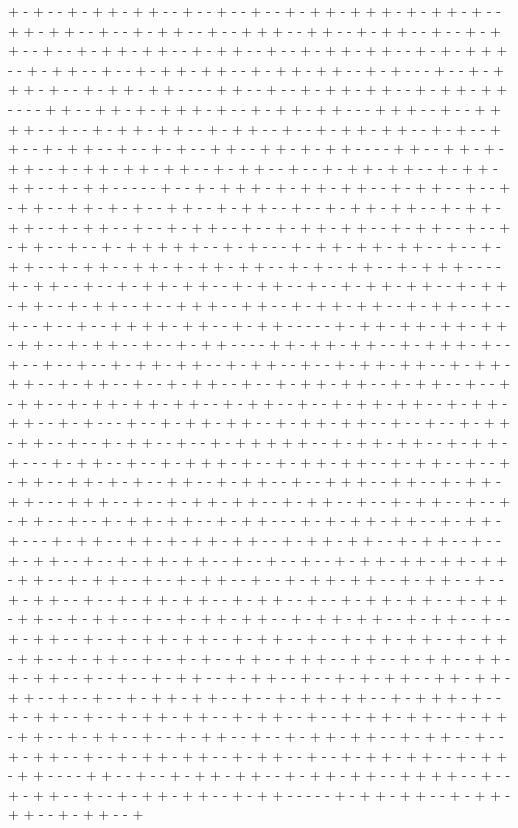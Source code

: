 + - + - - + - + + - + + - - + - - + - - + - - + - + + - + + + - + - + + - + - - + + - + + - - + - - + - + + - - + - - + + + - - + + - - + - + + - - + - - + - + + - - + - - + - + + - + + - - + - + + - - + - - + - + + - + + - - + - + - + + + - - + - + + - - + - - + - + + - + + - - + - + + - + + - - + - + - - - + - - + - + + + - + - - + - + + - + + - - - - + + - - + - - + - + + - + + - - + - + + - + + - - - - + + - - + + - + - + + + - + - - + - + + - + + - - - + + + - - + - - + + + + - - + - - + - + + - + + - - + - + + - - + - - + - + + - + + - - + - + - - + + - - + - + + - - + - - + - + - - + + - - + + - + - + + - - - - + + - - + + - + - + + - - + - + + - + + - + + - - + - + + - - + - - + - + + - + + - - + - + + - + + - - + - + + - - - - - + - - + - + + + - + - + + - + + - - + - + + - - + - - + - + + - - + + - + - + - - + + - - + - + + - - + - - + - + + - + + - - + - + + - + + - - + - + + - - + - - + - + + - - + - - + - + + - + + - - + - + + - - + - - + - + + - - + - - + - + + + + + - - + - + - - - + - + + - + + - + + - - + - - + - + + - - + - + + - - + + - + - + + - + + - - + - + - - + + - - + - + + + - - - - + - + + - - + - - + - + + - + + - - + - + + - - + - - + - + + - + + - - + - + + - + + - - + - + + - - + - - + + + - - + + - - + - + + - + + - - + - + + - - + - - + - - + - - + - - + + + + - + + - - + - + + - - - - - + - + + - + + - + + - + + - + + - - + - + + - - + - - + - + + - - - - + + - + + - + + - - + - + + + - + - - + - - + - - + - - + - + + - + + - - + - + + - - + - - + - + + - + + - - + - + + - + + - - + - + + - - + - - + - + + - - + - - + - + + - + + - - + - + + - - + - - + - + + - - + - + + - + + - + + - - + - + + - - + - - + - + + - + + - - + - + + - + + - - + - + - - - + - - + - + + - + + - - + - + + - + + - - + - - + - - + - + + - + + - - + - - + - + + - - + - - + - + + + + + - - + - + + - + + - - + - + + - + - - - + - + + - - + - - + - + + + - + - - + - + + - + + - - + - + + - - + - - + - + + - - + + - + - + - - + + - - + - + + - - + - - + + + - - + + - - + - + + - + + - - - + + + - - + - - + - + + - + + - - + - + + - - + - - + - + + - - + - - + - + + - - + - - + - + + - + + - - + - + + - - - + - + - + + - + + - - + - + + - + - - - + - + + - - + + - + - + + - + + - - + - + + - + + - - + - + + - - + - - + - + + - - + - - + - + + - + + - - + - - + - - + - - + - + + - + + - + + - + + - + + - - + - + + - - + - - + - + + - - + - - + - + + - + + - - + - + + - - + - - + - + + - - + - - + - + + - + + - - + - + + - - + - - + - + + - + + - - + - + + - + + - - + - + + - - + - - + - + + - + + - - + - + + - + + - - + - + + - - + - - + - + + - - + - - + - + + - + + - - + - + + - - + - - + - + + - + + - - + - + + - + + - - + - + + - - + - - + - + - - + + - - + + + - - + + - - + - + + - - + + - + - + + - - + - - + - - + - + + - - + - + + - - + - - + - + - + + - - + + - + + - + + - - + - - + - - + - + + - + + - - + - - + - + + - + + - - + - + + + - + - - + - + + - - + - - + - + + - + + - - + - + + - - + - - + - + + - + + - - + - + + - + + - - + - + + - - + - - + - + + - - + - - + - + + - + + - - + - + + - - + - - + - + + - - + - - + - + + - + + - - + - + + - - + - - + - + + - + + - - + - + + - + + - - - - + + - - + - - + - + + - + + - - + - + + - + + - - + + + + - - + - - + - + + - - + - - + - + + - + + - - + - + + - - - - - + - + + - + + - - + - + + - + + - - + - + + - - + 